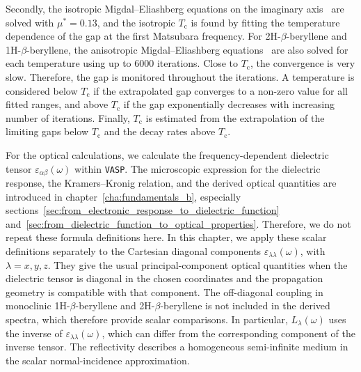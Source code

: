 Secondly, the isotropic Migdal--Eliashberg equations on the imaginary axis~\cite{giustino2017electron,eliashberg1960interactions,migdal1958interaction} are solved with $\mu^*=0.13$,
and the isotropic $T_\mathrm{c}$ is found by fitting the temperature dependence of the gap at the first Matsubara frequency.
For 2H-$\beta$-beryllene and 1H-$\beta$-beryllene,
the anisotropic Migdal--Eliashberg equations~\cite{margine2013anisotropic} are also solved for each temperature using up to 6000 iterations.
Close to $T_\mathrm{c}$, the convergence is very slow.
Therefore, the gap is monitored throughout the iterations.
A temperature is considered below $T_\mathrm{c}$ if the extrapolated gap converges to a non-zero value for all fitted ranges,
and above $T_\mathrm{c}$ if the gap exponentially decreases with increasing number of iterations.
Finally, $T_\mathrm{c}$ is estimated from the extrapolation of the limiting gaps below $T_\mathrm{c}$ and the decay rates above $T_\mathrm{c}$.

For the optical calculations,
we calculate the frequency-dependent dielectric tensor $\varepsilon_{\alpha\beta}(\omega)$ within \texttt{VASP}.
The microscopic expression for the dielectric response,
the Kramers--Kronig relation,
and the derived optical quantities are introduced in chapter~\ref{cha:fundamentals_b},
especially sections~\ref{sec:from_electronic_response_to_dielectric_function} and~\ref{sec:from_dielectric_function_to_optical_properties}.
Therefore, we do not repeat these formula definitions here.
In this chapter,
we apply these scalar definitions separately to the Cartesian diagonal components $\varepsilon_{\lambda\lambda}(\omega)$,
with $\lambda=x,y,z$.
They give the usual principal-component optical quantities when the dielectric tensor is diagonal in the chosen coordinates and the propagation geometry is compatible with that component.
The off-diagonal coupling in monoclinic 1H-$\beta$-beryllene and 2H-$\beta$-beryllene is not included in the derived spectra,
which therefore provide scalar comparisons.
In particular,
$L_{\lambda}(\omega)$ uses the inverse of $\varepsilon_{\lambda\lambda}(\omega)$,
which can differ from the corresponding component of the inverse tensor.
The reflectivity describes a homogeneous semi-infinite medium in the scalar normal-incidence approximation.

